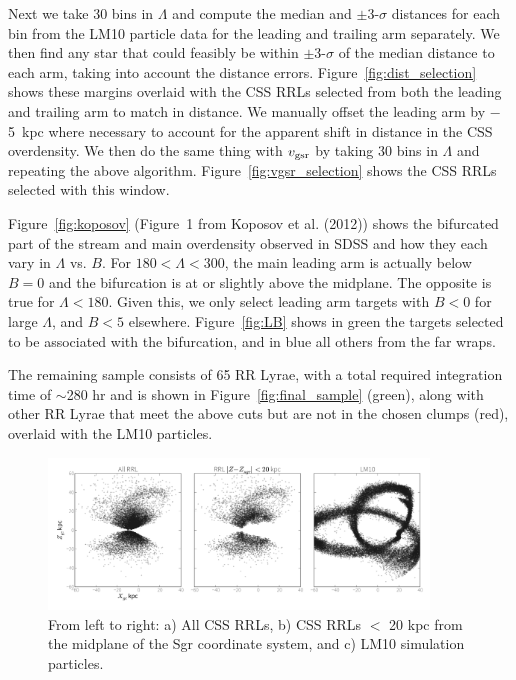 \documentclass[letterpaper,12pt,preprint]{aastex}
\begin{document}
Next we take 30 bins in $\Lambda$ and compute the median and $\pm$3-$\sigma$ distances for each bin from the LM10 particle data for the leading and trailing arm separately. We then find any star that could feasibly be within $\pm$3-$\sigma$ of the median distance to each arm, taking into account the distance errors. Figure~\ref{fig:dist_selection} shows these margins overlaid with the CSS RRLs selected from both the leading and trailing arm to match in distance. We manually offset the leading arm by $-$5~kpc where necessary to account for the apparent shift in distance in the CSS overdensity. We then do the same thing with $v_{\rm gsr}$ by taking 30 bins in $\Lambda$ and repeating the above algorithm. Figure~\ref{fig:vgsr_selection} shows the CSS RRLs selected with this window. 

Figure~\ref{fig:koposov} (Figure~1 from Koposov et al. (2012)) shows the bifurcated part of the stream and main overdensity observed in SDSS and how they each vary in $\Lambda$ vs. $B$. For $180 < \Lambda < 300$, the main leading arm is actually below $B=0$ and the bifurcation is at or slightly above the midplane. The opposite is true for $\Lambda < 180$. Given this, we only select leading arm targets with $B<0$ for large $\Lambda$, and $B<5$ elsewhere. Figure~\ref{fig:LB} shows in green the targets selected to be associated with the bifurcation, and in blue all others from the far wraps.

The remaining sample consists of 65 RR Lyrae, with a total required integration time of $\sim$280 hr and is shown in Figure~\ref{fig:final_sample} (green), along with other RR Lyrae that meet the above cuts but are not in the chosen clumps (red), overlaid with the LM10 particles.

\begin{figure}
\begin{center}
\includegraphics[width=0.9\textwidth]{catalina_all.pdf}
\caption{ From left to right: a) All CSS RRLs, b) CSS RRLs $<$ 20 kpc from the midplane of the Sgr coordinate system, and c) LM10 simulation particles. }\label{fig:css_all}
\end{center}
\end{figure}
\end{document}
